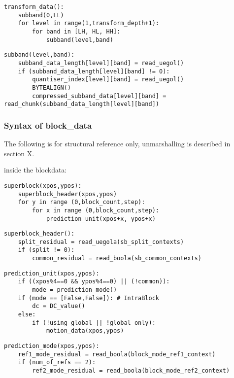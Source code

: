 \begin{verbatim}
transform_data():
    subband(0,LL)
    for level in range(1,transform_depth+1):
        for band in [LH, HL, HH]:
            subband(level,band)
\end{verbatim}

\begin{verbatim}
subband(level,band):
    subband_data_length[level][band] = read_uegol()
    if (subband_data_length[level][band] != 0):
        quantiser_index[level][band] = read_uegol()
        BYTEALIGN()
        compressed_subband_data[level][band] = read_chunk(subband_data_length[level][band])
\end{verbatim}


\subsubsection{Syntax of block\_data}

The following is for structural reference only, unmarshalling is
described in section X.

inside the blockdata:

\begin{verbatim}
superblock(xpos,ypos):
    superblock_header(xpos,ypos)
    for y in range (0,block_count,step):
        for x in range (0,block_count,step):
            prediction_unit(xpos+x, ypos+x)
\end{verbatim}

\begin{verbatim}
superblock_header():
    split_residual = read_uegola(sb_split_contexts)
    if (split != 0):
        common_residual = read_boola(sb_common_contexts)
\end{verbatim}

\begin{verbatim}
prediction_unit(xpos,ypos):
    if ((xpos%4==0 && ypos%4==0) || (!common)):
        mode = prediction_mode()
    if (mode == [False,False]): # IntraBlock
        dc = DC_value()
    else:
        if (!using_global || !global_only):
            motion_data(xpos,ypos)
\end{verbatim}

\begin{verbatim}
prediction_mode(xpos,ypos):
    ref1_mode_residual = read_boola(block_mode_ref1_context)
    if (num_of_refs == 2):
        ref2_mode_residual = read_boola(block_mode_ref2_context)
\end{verbatim}


